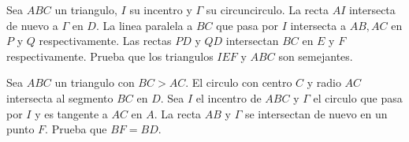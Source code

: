 \documentclass[11pt]{scrartcl}
\newcommand{\thmdifficulty}{0}
\newcommand{\problemdiff}[1]{\renewcommand{\thmdifficulty}{#1}}
\begin{document}
\problemdiff{3.5}
\begin{problem}
Sea $ABC$ un triangulo, $I$ su incentro y $\Gamma$ su circuncirculo. La recta $AI$ intersecta de nuevo a $\Gamma$ en $D$. La linea paralela a $BC$ que pasa por $I$ intersecta a $AB,AC$ en $P$ y $Q$ respectivamente. Las rectas $PD$ y $QD$ intersectan $BC$ en $E$ y $F$ respectivamente. Prueba que los triangulos $IEF$ y $ABC$ son semejantes.
\end{problem}

\problemdiff{3.5}
\begin{problem}
    Sea $ABC$ un triangulo con $BC>AC$. El circulo con centro $C$ y radio $AC$ intersecta al segmento $BC$ en $D$. Sea $I$ el incentro de $ABC$ y $\Gamma$ el circulo que pasa por $I$ y es tangente a $AC$ en $A$. La recta $AB$ y $\Gamma$ se intersectan de nuevo en un punto $F$. Prueba que $BF=BD$.
\end{problem}
\end{document}
